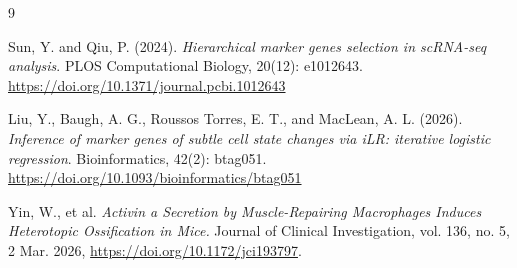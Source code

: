 \documentclass[11pt,a4paper]{article}
\begin{document}
\begin{thebibliography}{9}

Sun, Y. and Qiu, P. (2024). \textit{Hierarchical marker genes selection in scRNA-seq analysis}. PLOS Computational Biology, 20(12): e1012643. \url{https://doi.org/10.1371/journal.pcbi.1012643}

Liu, Y., Baugh, A. G., Roussos Torres, E. T., and MacLean, A. L. (2026). \textit{Inference of marker genes of subtle cell state changes via iLR: iterative logistic regression}. Bioinformatics, 42(2): btag051. \url{https://doi.org/10.1093/bioinformatics/btag051}

Yin, W., et al. \textit{Activin a Secretion by Muscle-Repairing Macrophages Induces Heterotopic Ossification in Mice.} Journal of Clinical Investigation, vol. 136, no. 5, 2 Mar. 2026, \url{https://doi.org/10.1172/jci193797}.

\end{thebibliography}
\end{document}

